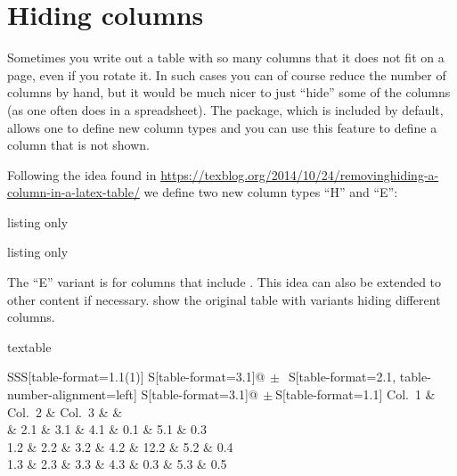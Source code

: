 \section{Hiding columns}
\label{sec:tab:hide}

Sometimes you write out a table with so many columns that it does not fit
on a page, even if you rotate it.
In such cases you can of course reduce the number of columns by hand,
but it would be much nicer to just \enquote{hide} some of the columns
(as one often does in a spreadsheet).
The  package,
which is included by default,
allows one to define new column types
and you can use this feature to define a column that is not shown.

Following the idea found in
\url{https://texblog.org/2014/10/24/removinghiding-a-column-in-a-latex-table/}
we define two new column types \enquote{H} and \enquote{E}:

\begin{tcblisting}{listing only}
\end{tcblisting}{listing only}

The \enquote{E} variant is for columns that include .
This idea can also be extended to other content if necessary.
 show the original table
with variants hiding different columns.

\begin{table}[htbp]
  \caption{Simple table with columns that we want to hide.}%
  \label{tab:column1}
\begin{tcblisting}{textable}
\centering
\begin{tabular}{SSS[table-format=1.1(1)]
  S[table-format=3.1]@{\(\,\pm\,\)}
  S[table-format=2.1, table-number-alignment=left]
  S[table-format=3.1]@{\(\,\pm\!\!\)}S[table-format=1.1]}
  \toprule
  {Col.\ 1} & {Col.\ 2} & {Col.\ 3} &
   &
   \\
   & 2.1 & 3.1  & 4.1 & 0.1 & 5.1 & 0.3 \\
  1.2 & 2.2 & 3.2  & 4.2 & 12.2 & 5.2 & 0.4 \\
  1.3 & 2.3 & 3.3  & 4.3 & 0.3 & 5.3 & 0.5\\
  \bottomrule
\end{tabular}
\end{tcblisting}
\end{table}

